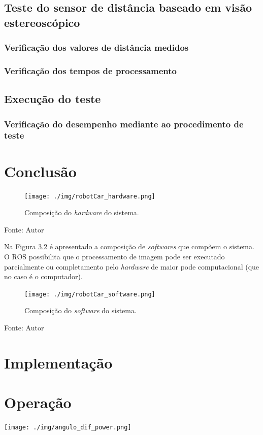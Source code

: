 \section{Teste do sensor de distância baseado em visão estereoscópico}
    \subsection{Verificação dos valores de distância medidos}
    \pagebreak
    
    \subsection{Verificação dos tempos de processamento}
    \pagebreak
    
\section{Execução do teste}
    \subsection{Verificação do desempenho mediante ao procedimento de teste}
    \pagebreak
    
\chapter{Conclusão}

\begin{figure}[!htb]
  \centering
  \caption{Composição do \textit{hardware} do sistema.}
  \label{fig:robotCar_hardware}
  \texttt{[image: ./img/robotCar\_hardware.png]}
\end{figure}
Fonte: Autor

\pagebreak

Na Figura \ref{fig:robotCar_software} é apresentado a composição de \textit{softwares} que compõem o sistema. O ROS possibilita que o processamento de imagem pode ser executado parcialmente ou completamento pelo \textit{hardware} de maior pode computacional (que no caso é o computador).

\begin{figure}[!htb]
  \centering
  \caption{Composição do \textit{software} do sistema.}
  \label{fig:robotCar_software}
  \texttt{[image: ./img/robotCar\_software.png]}
\end{figure}
Fonte: Autor

\pagebreak

\chapter{Implementação}

\chapter{Operação}
  \texttt{[image: ./img/angulo\_dif\_power.png]}

